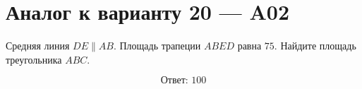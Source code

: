 


\section*{Аналог к варианту 20 — A02}
Средняя линия \(DE\parallel AB\). Площадь трапеции \(ABED\) равна \(75\). Найдите площадь треугольника \(ABC\).
\begin{center}\figMidlineTriangle\end{center}
\[\boxed{\text{Ответ: }100}\]


